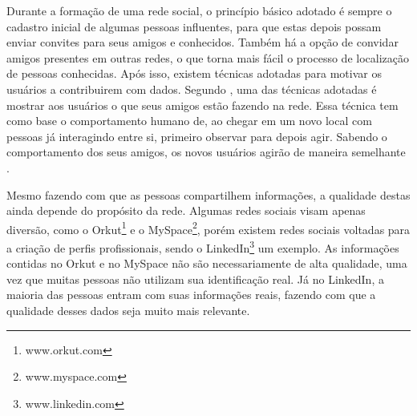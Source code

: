 
Durante a formação de uma rede social, o princípio básico adotado é sempre o cadastro inicial de algumas pessoas influentes, para que estas depois possam enviar convites para seus amigos e conhecidos. Também há a opção de convidar amigos presentes em outras redes, o que torna mais fácil o processo de localização de pessoas conhecidas. Após isso, existem técnicas adotadas para motivar os usuários a contribuirem com dados. Segundo \cite{BurkeFeedMe}, uma das técnicas adotadas é mostrar aos usuários o que seus amigos estão fazendo na rede. Essa técnica tem como base o comportamento humano de, ao chegar em um novo local com pessoas já interagindo entre si, primeiro observar para depois agir. Sabendo o comportamento dos seus amigos, os novos usuários agirão de maneira semelhante \cite{BurkeFeedMe}.

Mesmo fazendo com que as pessoas compartilhem informações, a qualidade destas ainda depende do propósito da rede. Algumas redes sociais visam apenas diversão, como o Orkut\footnote{www.orkut.com} e o MySpace\footnote{www.myspace.com}, porém existem redes sociais voltadas para a criação de perfis profissionais, sendo o LinkedIn\footnote{www.linkedin.com} um exemplo. As informações contidas no Orkut e no MySpace não são necessariamente de alta qualidade, uma vez que muitas pessoas não utilizam sua identificação real. Já no LinkedIn, a maioria das pessoas entram com suas informações reais, fazendo com que a qualidade desses dados seja muito mais relevante.





